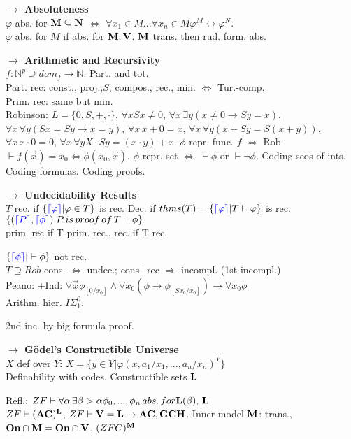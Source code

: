 \documentclass[9pt]{article}
\newcommand{\class}[1]{{\bf #1}}
\newcommand{\N}{\mathbb{N}}
\newcommand{\code}[1]{{\color{blue}\lceil#1\rceil}}
\newcommand{\mytitle}[1]{ {\bf $\rightarrow$ #1}\\}
\newcommand{\V}{\class{V}}
\begin{document}
\begin{multicols*}{2}
\mytitle{Absoluteness}
$\varphi$ abs. for $\class{M}\subseteq\class{N}$ $\Leftrightarrow$ $\forall x_1\in M...\forall x_n\in M \varphi^M\leftrightarrow\varphi^N$.\\
$\varphi$ abs. for $M$ if abs. for $\class{M}, \V$.
$\class{M}$ trans. then rud. form. abs.

\mytitle{Arithmetic and Recursivity}
$f\colon \N^p\supseteq dom_f\to \N$. Part. and tot.\\
Part. rec: const., proj.,$S$, compos., rec., min. $\Leftrightarrow$ Tur.-comp.\\
Prim. rec: same but min.\\
Robinson: $L=\{0,S,+,\cdot\}$, $\forall x Sx\neq 0$, $\forall x\,\exists y (x\neq 0\to Sy=x)$, $\forall x \,\forall y (Sx=Sy\to x=y)$, $\forall x\,x+0=x$, $\forall x\,\forall y (x+Sy=S(x+y))$, $\forall x\,x\cdot 0=0$, $\forall x\,\forall y X\cdot Sy=(x\cdot y)+x$.
$\phi$ repr. func. $f$ $\Leftrightarrow$ Rob$\vdash f(\vec{x})=x_0\Leftrightarrow\phi(x_0,\vec{x})$. $\phi$ repr. set $\Leftrightarrow$ $\vdash\phi$ or $\vdash\neg\phi$. Coding seqs of ints. Coding formulas. Coding proofs.

\mytitle{Undecidability Results}
$T$ rec. if $\{\code{\varphi}|\varphi\in T\}$ is rec. Dec. if $thms(T)=\{\code{\varphi}|T\vdash\varphi\}$ is rec.\\
$\{(\code{P},\code{\phi})|P\,is\,proof\,of\,T\vdash\phi\}$\\
prim. rec if T prim. rec., rec. if T rec.

$\{\code{\phi}|\vdash\phi\}$ not rec.\\
$T\supseteq Rob$ cons. $\Leftrightarrow$ undec.; cons+rec $\Rightarrow$ incompl. (1st incompl.)\\
Peano: +Ind: $\forall \vec{x}\phi_{[0/x_0]}\wedge\forall x_0(\phi\to \phi_{[Sx_0/x_0]})\to\forall x_0\phi$\\
Arithm. hier. $I\Sigma_1^0$.

2nd inc. by big formula proof.

\mytitle{G\"odel's Constructible Universe}
$X$ def over $Y$: $X=\{y\in Y|\varphi(x,a_1/x_1,...,a_n/x_n)^Y\}$\\
Definability with codes. Constructible sets $\class{L}$

Refl.: $ZF\vdash \forall\alpha\,\exists\beta>\alpha \phi_0,...,\phi_n\,abs.\,for \class{L}(\beta),\,\class{L}$\\
$ZF\vdash (\class{AC})^{\class{L}}$, $ZF\vdash \V=\class{L}\to \class{AC}, \class{GCH}$.
Inner model $\class{M}$: trans., $\class{On}\cap\class{M}=\class{On}\cap\V$, $(ZFC)^\class{M}$


\end{multicols*}
\end{document}
